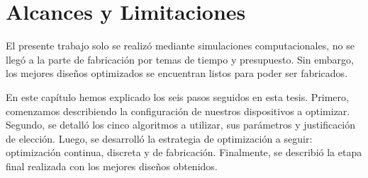 \section{Alcances y Limitaciones}

El presente trabajo solo se realizó mediante simulaciones computacionales, no se llegó a la parte de
fabricación por temas de tiempo y presupuesto. Sin embargo, los mejores diseños optimizados se
encuentran listos para poder ser fabricados.

En este capítulo hemos explicado los seis pasos seguidos en esta tesis.
Primero, comenzamos describiendo la configuración de nuestros dispositivos a optimizar.
Segundo, se detalló los cinco algoritmos a utilizar, sus parámetros y justificación de elección.
Luego, se desarrolló la estrategia de optimización a seguir: optimización continua, discreta y de fabricación.
Finalmente, se describió la etapa final realizada con los mejores diseños obtenidos.
